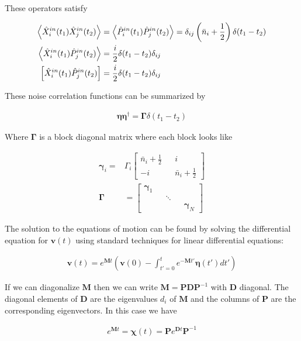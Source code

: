 \documentclass[12pt]{article}
\newcommand{\bv}[1]{\boldsymbol{#1}}
\begin{document}
These operators satisfy

\begin{align}
\Braket{\hat{X}_i^{in}(t_1)\hat{X}_j^{in}(t_2)} &=  \Braket{\hat{P}_i^{in}(t_1)\hat{P}_j^{in}(t_2)} = \delta_{ij} \left(\bar{n}_i+\frac{1}{2}\right)\delta(t_1-t_2)\\
\Braket{\hat{X}_i^{in}(t_1)\hat{P}_j^{in}(t_2)} &= \frac{i}{2}\delta(t_1-t_2)\delta_{ij}\\
\left[\hat{X}_i^{in}(t_1)\hat{P}_j^{in}(t_2)\right] &= \frac{i}{2}\delta(t_1-t_2)\delta_{ij}\\
\end{align}

These noise correlation functions can be summarized by

\begin{align}
\bv{\eta}\bv{\eta}^{\dag} = \bv{\Gamma}\delta(t_1-t_2)
\end{align}

Where $\bv{\Gamma}$ is a block diagonal matrix where each block looks like

\begin{align}
\bv{\gamma}_i = &\Gamma_i
\begin{bmatrix}
\bar{n}_i+\frac{1}{2} && i\\
-i && \bar{n}_i+\frac{1}{2}
\end{bmatrix}\\
\bv{\Gamma} &= 
\begin{bmatrix}
\bv{\gamma}_1 && &&\\
 && \ddots && \\
 && && \bv{\gamma}_N
\end{bmatrix}
\end{align}

The solution to the equations of motion can be found by solving the differential equation for $\bv{v}(t)$ using standard techniques for linear differential equations:

\begin{align}
\bv{v}(t) = e^{\bv{M} t}\left(\bv{v}(0) - \int_{t'=0}^{t} e^{-\bv{M}t'}\bv{\eta}(t') dt' \right)
\end{align}

If we can diagonalize $\bv{M}$ then we can write $\bv{M} = \bv{P}\bv{D}\bv{P}^{-1}$ with $\bv{D}$ diagonal. The diagonal elements of $\bv{D}$ are the eigenvalues $d_i$ of $\bv{M}$ and the columns of $\bv{P}$ are the corresponding eigenvectors. In this case we have

\begin{align}
e^{\bv{M}t} = \bv{\chi}(t) = \bv{P}e^{\bv{D}t}\bv{P}^{-1}
\end{align}
\end{document}
